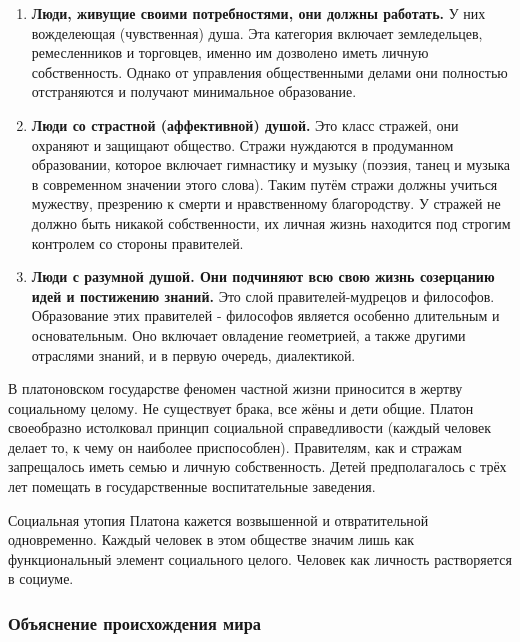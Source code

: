 \documentclass[
]{article}
\begin{document}
\begin{enumerate}
\def\labelenumi{\arabic{enumi}.}
\item
  \textbf{Люди, живущие своими потребностями, они должны работать.} У
  них вожделеющая (чувственная) душа. Эта категория включает
  земледельцев, ремесленников и торговцев, именно им дозволено иметь
  личную собственность. Однако от управления общественными делами они
  полностью отстраняются и получают минимальное образование.
\item
  \textbf{Люди со страстной (аффективной) душой.} Это класс стражей, они
  охраняют и защищают общество. Стражи нуждаются в продуманном
  образовании, которое включает гимнастику и музыку (поэзия, танец и
  музыка в современном значении этого слова). Таким путём стражи должны
  учиться мужеству, презрению к смерти и нравственному благородству. У
  стражей не должно быть никакой собственности, их личная жизнь
  находится под строгим контролем со стороны правителей.
\item
  \textbf{Люди с разумной душой. Они подчиняют всю свою жизнь созерцанию
  идей и постижению знаний.} Это слой правителей-мудрецов и философов.
  Образование этих правителей - философов является особенно длительным и
  основательным. Оно включает овладение геометрией, а также другими
  отраслями знаний, и в первую очередь, диалектикой.
\end{enumerate}

В платоновском государстве феномен частной жизни приносится в жертву
социальному целому. Не существует брака, все жёны и дети общие. Платон
своеобразно истолковал принцип социальной справедливости (каждый человек
делает то, к чему он наиболее приспособлен). Правителям, как и стражам
запрещалось иметь семью и личную собственность. Детей предполагалось с
трёх лет помещать в государственные воспитательные заведения.

Социальная утопия Платона кажется возвышенной и отвратительной
одновременно. Каждый человек в этом обществе значим лишь как
функциональный элемент социального целого. Человек как личность
растворяется в социуме.

\hypertarget{ux43eux431ux44aux44fux441ux43dux435ux43dux438ux435-ux43fux440ux43eux438ux441ux445ux43eux436ux434ux435ux43dux438ux44f-ux43cux438ux440ux430}{%
\subsubsection{Объяснение происхождения
мира}\label{ux43eux431ux44aux44fux441ux43dux435ux43dux438ux435-ux43fux440ux43eux438ux441ux445ux43eux436ux434ux435ux43dux438ux44f-ux43cux438ux440ux430}}
\end{document}
